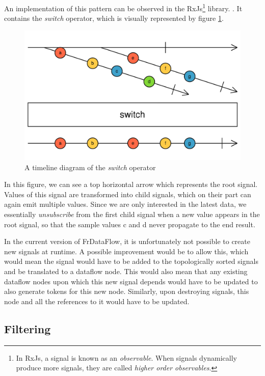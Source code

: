 An implementation of this pattern can be observed in the RxJs\footnote{In RxJs, a signal is known as an \textit{observable}. When signals dynamically produce more signals, they are called \textit{higher order observables}.} library. \citep{noauthor_observable_2017}. It contains the \textit{switch} operator, which is visually represented by figure \ref{fig:futurework-dynamicsignals-switch}.

\begin{figure}[h!]
	\includegraphics[width=\textwidth]{images/FutureWork-DynamicSignals-Switch.png}
	\caption{A timeline diagram of the \textit{switch} operator}
	\label{fig:futurework-dynamicsignals-switch}
\end{figure}

In this figure, we can see a top horizontal arrow which represents the root signal. Values of this signal are transformed into child signals, which on their part can again emit multiple values. 
Since we are only interested in the latest data, we essentially \textit{unsubscribe} from the first child signal when a new value appears in the root signal, so that the sample values c and d never propagate to the end result. 

In the current version of FrDataFlow, it is unfortunately not possible to create new signals at runtime. A possible improvement would be to allow this, which would mean the signal would have to be added to the topologically sorted signals and be translated to a dataflow node. This would also mean that any existing dataflow nodes upon which this new signal depends would have to be updated to also generate tokens for this new node. Similarly, upon destroying signals, this node and all the references to it would have to be updated.

\subsection{Filtering}

